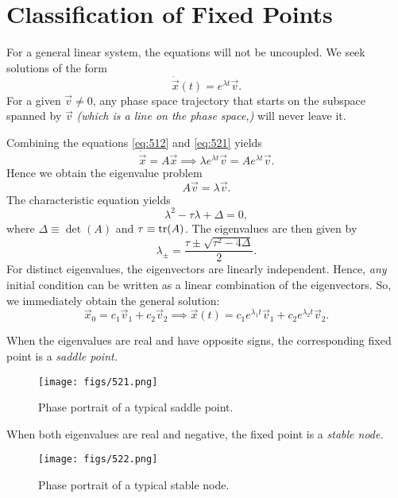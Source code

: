 \documentclass[oneside]{book}
\begin{document}
\section{Classification of Fixed Points}
For a general linear system, the equations will not be uncoupled. We seek solutions of the form
\begin{equation} \label{eq:521}
\dot{\vec{x}}(t) = e^{\lambda t} \vec{v}.
\end{equation}
For a given $ \vec{v} \neq 0 $, any phase space trajectory that starts on the subspace spanned by $ \vec{v} $\textit{ (which is a line on the phase space,)} will never leave it.
\par
Combining the equations \eqref{eq:512} and \eqref{eq:521} yields
\[
\dot{\vec{x}} = A \vec{x} \implies \lambda e ^ {\lambda t} \vec{v} = A e^{\lambda t} \vec{v}.
\]
Hence we obtain the eigenvalue problem
\begin{equation} \label{eq:522}
	A \vec{v} = \lambda \vec{v}.
\end{equation}
The characteristic equation yields
\[
\lambda^ 2 - \tau \lambda + \Delta = 0,
\]
where $ \Delta \equiv \det(A) $ and $ \tau \equiv \tr(A) $. The eigenvalues are then given by
\begin{equation} \label{eq:523}
	\lambda _ {\pm} = \frac{\tau \pm \sqrt{\tau^2 - 4 \Delta}}{2}.
\end{equation}
For distinct eigenvalues, the eigenvectors are linearly independent. Hence, \textit{any} initial condition can be written as a linear combination of the eigenvectors. So, we immediately obtain the general solution:
\[
\vec{x}_0 = c_1 \vec{v}_1 + c_2 \vec{v}_2 \implies \vec{x}(t) = c_1 e^{\lambda_1 t} \vec{v}_1 + c_2 e^{\lambda_2 t} \vec{v}_2.
\]
\begin{definition}
	When the eigenvalues are real and have opposite signs, the corresponding fixed point is a \textit{saddle point.}
\end{definition}
\begin{figure}[h]
	\centering
	\texttt{[image: figs/521.png]}
	\caption{Phase portrait of a typical saddle point.}
\end{figure}
\begin{definition}
	When both eigenvalues are real and negative, the fixed point is a \textit{stable node.}
\end{definition}
\begin{figure}[h]
	\centering
	\texttt{[image: figs/522.png]}
	\caption{Phase portrait of a typical stable node.}
\end{figure}
\end{document}

